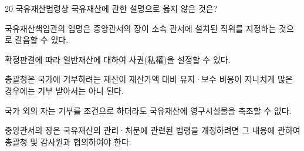 \begin{question}{20}
국유재산법령상 국유재산에 관한 설명으로 옳지 않은 것은?
\begin{choices}
  \item 국유재산책임관의 임명은 중앙관서의 장이 소속 관서에 설치된 직위를 지정하는 것으로 갈음할 수 있다.
  \item 확정판결에 따라 일반재산에 대하여 사권(私權)을 설정할 수 있다.
  \item 총괄청은 국가에 기부하려는 재산이 재산가액 대비 유지·보수 비용이 지나치게 많은 경우에는 기부 받아서는 아니 된다.
  \item 국가 외의 자는 기부를 조건으로 하더라도 국유재산에 영구시설물을 축조할 수 없다.
  \item 중앙관서의 장은 국유재산의 관리·처분에 관련된 법령을 개정하려면 그 내용에 관하여 총괄청 및 감사원과 협의하여야 한다.
\end{choices}
\end{question}
